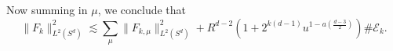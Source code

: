 %
Now summing in $\mu$, we conclude that
%
\[ \| F_k \|_{L^2(S^d)}^2 \lesssim \sum_\mu \| F_{k,\mu} \|_{L^2(S^d)}^2 + R^{d-2} \left( 1 + 2^{k(d-1)} u^{1 - a \left( \frac{d-3}{2} \right)} \right) \# \mathcal{E}_k. \]
\begin{comment}

But this means that
%
\[ \sum_{(x_1,t_1) \in \mathcal{H}_{x_0,t_0,l}} |\langle {S\!}_{x_0,t_0}, {S\!}_{x_1,t_1} \rangle| \lesssim (2^l u^a)^{- \frac{d-1}{2}} (u^{a+1} 2^l) = u^{1 - a \left( \frac{d-3}{2} \right)} 2^{- l \left( \frac{d-3}{2} \right)}. \]
%
Since $d \geq 4$, we can sum to conclude that
%
\[ \sum_{1 \leq l \leq k - a \log_2 u} \]
Summing over $1 \leq l \leq k - a \log_2 u$, 

\[ \lesssim \frac{1}{(R d_g(x_0,x_1))^{\frac{d-1}{2}}} \langle R | d_g(x_0,x_1) - (t_0 - t_1) | \rangle^{-M} \]


 and $0 \leq l \lesssim R u^{-a}$, define
%
\[ \mathcal{H}_{x_0,t_0,l} = \left\{ (x_1,t_1) \in \mathcal{E}_{k,\mu'} : l(u^a / R) \leq d_g(x_0,x_1) \leq (l+1)(u^a/R) \right\}. \]
%
Note that for $(x_0,t_0) \in \mathcal{E}_{k,\mu}$ and $(x_1,t_1) \in \mathcal{E}_{k,\mu'}$, $t_0 - t_1$ lies in a radius $O(u^a / R)$ interval centered at $(\mu - \mu') (u^a / R)$:
%
\begin{itemize}
    \item For $0 \leq l \leq (\mu - \mu') / 2$, if $(x_1,t_1) \in \mathcal{H}_{x_0,t_0,l}$, then $x_1$ lies in a thickness $O(u^a / R)$, radius $l (u^a / R)$ geodesic annulus centered at $x_0$. Thus $\mathcal{H}_{x_0,t_0,l}$ is covered by $O( \langle l \rangle ^{d-1})$ balls of radius $u^a / R$. Note that we incurred the logarithmic error in $u$ so that we can assume $u^a \leq 2^k$, so that the density properties of $\mathcal{E}_k$ imply that
    \[ \# \mathcal{H}_{x_0,t_0,l} \lesssim (Ru) \langle l^{d-1} \rangle (u^a / R) = u^{a+1} \langle l \rangle^{d-1}. \]
    Together with Lemma \ref{mainOrthogonalityLemma}, we conclude that
    \[ \sum_{(x_1,t_1) \in \mathcal{H}_{x_0,t_0,l}} |\langle {S\!}_{x_0,t_0}, {S\!}_{x_1,t_1} \rangle| \lesssim_M ( u^{a+1} \langle l \rangle^{d-1} ) \left( \langle l u^a \rangle^{- \frac{d-1}{2}} \left( (\mu - \mu') u^a \right)^{-M} \right). \]
    Picking $M \gtrsim d$ and summing over $0 \leq l \leq (\mu - \mu') / 2$, $\mu' \leq \mu - 10$, and $(x_0,t_0) \in \mathcal{E}_{k,\mu}$ gives that
    \[ \sum_{(x_0,t_0) \in \mathcal{E}_{k,\mu}} \sum_{\mu' \leq \mu - 10} \sum_{0 \leq l \leq (\mu - \mu') / 2} \sum_{(x_1,t_1) \in \mathcal{H}_{x_0,t_0,l}'} |\langle {S\!}_{x_0,t_0}, {S\!}_{x_1,t_1} \rangle| \lesssim \# \mathcal{E}_{k,\mu}. \]


\end{comment}
